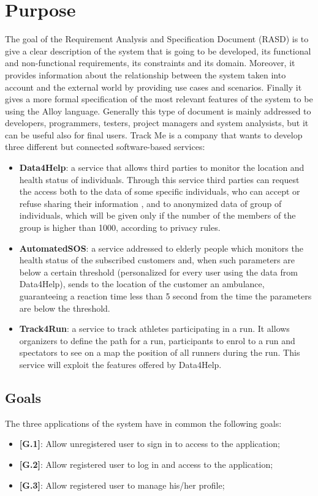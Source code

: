 \section{Purpose}
The  goal of the Requirement Analysis and Specification Document (RASD) is to give a clear description of the system that is going to be developed, its functional and non-functional requirements, its constraints and its domain. Moreover, it provides information about the relationship between the system taken into account and the external world by providing use cases and scenarios. Finally it gives a more formal specification of the most relevant features of the system to be using the Alloy language.
Generally this type of document is mainly addressed to developers, programmers, testers, project managers and system analysists, but it can be useful also for final users.
Track Me is a company that wants to develop three different but connected software-based services:
\begin{itemize}
  \item \textbf{Data4Help}: a service that allows third parties to monitor the location and health status of individuals. Through this service third parties can request the access both to the data of some specific individuals, who can accept or refuse sharing their information , and to anonymized data of group of individuals, which will be given only if the number of the members of the group is higher than 1000, according to privacy rules.
  \item \textbf{AutomatedSOS}: a service addressed to elderly people which monitors the health status of the subscribed customers and, when such parameters are below a certain threshold (personalized for every user using the data from Data4Help), sends to the location of the customer an ambulance, guaranteeing a reaction time less than 5 second from the time the parameters are below the threshold.
  \clearpage
  \item \textbf{Track4Run}: a service to track athletes participating in a run. It allows organizers to define the path for a run, participants to enrol to a run and spectators to see on a map the position of all runners during the run. This service will exploit the features offered by Data4Help.
\end{itemize}

\subsection{Goals}
The three applications of the system have in common the following goals:
\begin{itemize}
  \item \textbf{[G.1]}: Allow unregistered user to sign in to access to the application;
  \item \textbf{[G.2]}: Allow registered user to log in and access to the application;
  \item \textbf{[G.3]}: Allow registered user to manage his/her profile;
\end{itemize}

